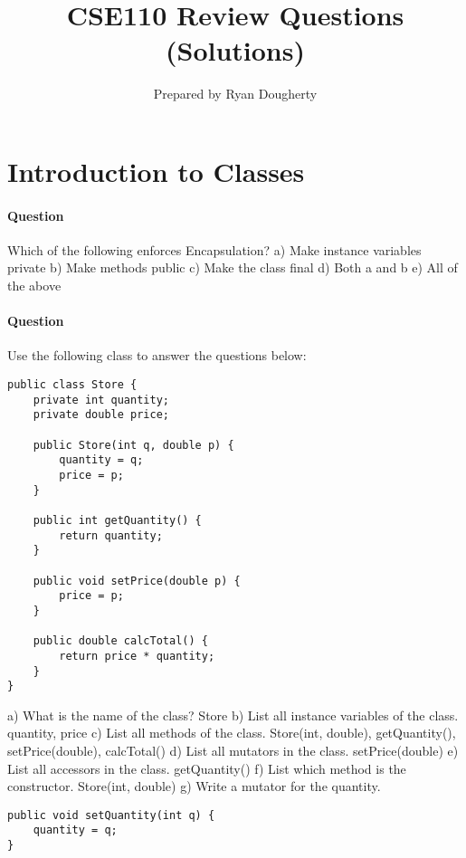 \documentclass{article}
\title{CSE110 Review Questions (Solutions)}
\author{Prepared by Ryan Dougherty}
\date{}
\begin{document}
\maketitle

\section{Introduction to Classes}


\setcounter{question_num}{1}
\paragraph{Question }
Which of the following enforces Encapsulation?
\newline a) Make instance variables private
\newline b) Make methods public
\newline c) Make the class final
\newline d) Both a and b
\newline e) All of the above

\addtocounter{question_num}{1}
\paragraph{Question }
Use the following class to answer the questions below:
\begin{lstlisting}
public class Store {
	private int quantity;
	private double price;

	public Store(int q, double p) {
		quantity = q;
		price = p;
	}

	public int getQuantity() {
		return quantity;
	}

	public void setPrice(double p) {
		price = p;
	}

	public double calcTotal() {
		return price * quantity;
	}
}
\end{lstlisting}
a) What is the name of the class? {\color{red}Store}
\newline b) List all instance variables of the class. {\color{red}quantity, price}
\newline c) List all methods of the class. {\color{red}Store(int, double), getQuantity(), setPrice(double), calcTotal()}
\newline d) List all mutators in the class. {\color{red}setPrice(double)}
\newline e) List all accessors in the class. {\color{red}getQuantity()}
\newline f) List which method is the constructor. {\color{red}Store(int, double)}
\newline g) Write a mutator for the quantity.
\begin{lstlisting}
public void setQuantity(int q) {
	quantity = q;
}
\end{lstlisting}
\end{document}
